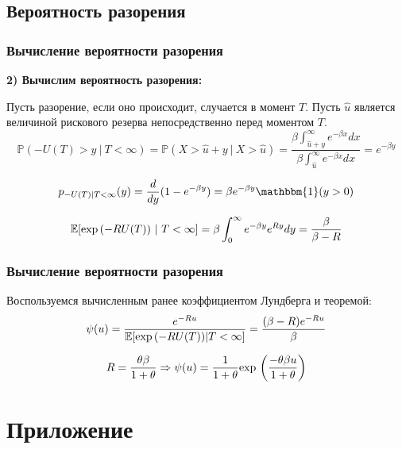 \documentclass[10pt]{beamer}
\newcommand\Exp{{\rm exp \,}}
\begin{document}
\subsection{Вероятность разорения}
\begin{frame}
\frametitle{Вычисление вероятности разорения}
\noindent
\textbf{2) Вычислим вероятность разорения:}

\noindent
Пусть разорение, если оно происходит, случается в момент $T$.
Пусть $\hat{u}$ является величиной рискового резерва непосредственно перед моментом $T$.
\begin{equation}
\mathbb{P}(-U(T)>y\ |\ T < \infty) = \mathbb{P}(X > \hat{u} + y \ | \ X > \hat{u}) =
\frac   {\beta\int_{\hat{u}+y}^{\infty} e^{-\beta x}dx}
        {\beta\int_{\hat{u}}^{\infty}   e^{-\beta x}dx}
                                                        = e^{-\beta y}
\end{equation}

\begin{equation}
p_{-U(T)|T < \infty}(y) = \frac{d}{dy}(1-e^{-\beta y}) = \beta e^{-\beta y} \mathbbm{1}(y > 0)
\end{equation}

\begin{equation}
\mathbb{E}[\Exp(-RU(T)) \ | \ T<\infty] = \beta\int_{0}^{\infty} e^{-\beta y} e^{Ry}dy =
\frac{\beta}{\beta - R}
\end{equation}
\end{frame}


\begin{frame}
\frametitle{Вычисление вероятности разорения}

\noindent
Воспользуемся вычисленным ранее коэффициентом Лундберга и теоремой:
\begin{equation}
\psi(u) = \frac{e^{-Ru}}{\mathbb{E}[\Exp(-RU(T))|T < \infty]} = \frac{(\beta-R)e^{-Ru}}{\beta}
\end{equation}

\begin{equation}
R = \frac{\theta\beta}{1 + \theta} \Rightarrow
\psi(u) = \frac{1}{1+\theta} \Exp\left(\frac{-\theta\beta u}{1+\theta}\right)
\end{equation}
\end{frame}


\section{Приложение}
\end{document}
